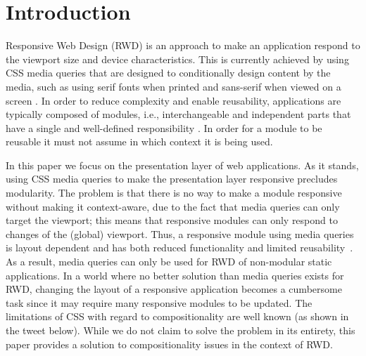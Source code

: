 \documentclass[sigconf,9pt]{acmart}
\begin{document}




\maketitle

\section{Introduction}
  Responsive Web Design (RWD) is an approach to make an application respond to the viewport size and device characteristics.
  This is currently achieved by using CSS media queries that are designed to conditionally design content by the media, such as using serif fonts when printed and sans-serif when viewed on a screen \cite{w3c_css_mq}.
  In order to reduce complexity and enable reusability, applications are typically composed of modules, i.e., interchangeable and independent parts that have a single and well-defined responsibility \cite{parnas1972criteria}.
  In order for a module to be reusable it must not assume in which context it is being used.

  In this paper we focus on the presentation layer of web applications.
  As it stands, using CSS media queries to make the presentation layer responsive precludes modularity.
  The problem is that there is no way to make a module responsive without making it context-aware, due to the fact that media queries can only target the viewport; this means that responsive modules can only respond to changes of the (global) viewport.
  Thus, a responsive module using media queries is layout dependent and has both reduced functionality and limited reusability~\cite{elq-thesis}.
  As a result, media queries can only be used for RWD of non-modular static applications.
  In a world where no better solution than media queries exists for RWD, changing the layout of a responsive application becomes a cumbersome task since it may require many responsive modules to be updated.
  The limitations of CSS with regard to compositionality are well known (as shown in the tweet below). While we do not claim to solve the problem in its entirety, this paper provides a solution to compositionality issues in the context of RWD.
\end{document}
